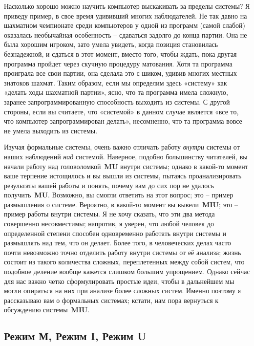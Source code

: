 \documentclass[../main.tex]{subfiles}
\begin{document}
Насколько хорошо можно научить компьютер выскакивать за пределы системы? Я приведу пример, в свое время удививший многих наблюдателей. Не так давно на шахматном чемпионате среди компьютеров у одной из программ (самой слабой) оказалась необычайная особенность \--- сдаваться задолго до конца партии. Она не была хорошим игроком, зато умела увидеть, когда позиция становилась безнадежной, и сдаться в этот момент, вместо того, чтобы ждать, пока другая программа пройдет через скучную процедуру матования. Хотя та программа проиграла все свои партии, она сделала это с шиком, удивив многих местных знатоков шахмат. Таким образом, если мы определим здесь «систему» как «делать ходы шахматной партии», ясно, что та программа имела сложную, заранее запрограммированную способность выходить из системы. С другой стороны, если вы считаете, что «системой» в данном случае является «все то, что компьютер запрограммирован делать», несомненно, что та программа вовсе не умела выходить из системы.

Изучая формальные системы, очень важно отличать работу \emph{внутри} системы от наших наблюдений \emph{над} системой. Наверное, подобно большинству читателей, вы начали работу над головоломкой~\textbf{MU} внутри системы; однако в какой-то момент ваше терпение истощилось и вы вышли из системы, пытаясь проанализировать результаты вашей работы и понять, почему вам до сих пор не удалось получить~\textbf{MU}\@. Возможно, вы смогли ответить на этот вопрос; это \--- пример размышления о системе. Вероятно, в какой-то момент вы вывели~\textbf{MIU}; это \--- пример работы внутри системы. Я не хочу сказать, что эти два метода совершенно несовместимы; напротив, я уверен, что любой человек до определенной степени способен одновременно работать внутри системы и размышлять над тем, что он делает. Более того, в человеческих делах часто почти невозможно точно отделить работу внутри системы от её анализа; жизнь состоит из такого количества сложных, переплетенных между собой систем, что подобное деление вообще кажется слишком большим упрощением. Однако сейчас для нас важно четко сформулировать простые идеи, чтобы в дальнейшем мы могли опираться на них при анализе более сложных систем. Именно поэтому я рассказываю вам о формальных системах; кстати, нам пора вернуться к обсуждению системы~\textbf{MIU}.


\subsection{Режим М, Режим I, Режим U}
\end{document}
